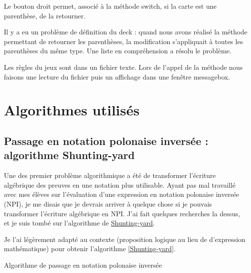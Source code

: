 \documentclass[12pt, algo]{cours}
\begin{document}
Le bouton droit permet, associé à la méthode switch, si la carte est une parenthèse, de la retourner.

Il y a eu un problème de définition du deck : quand nous avons réalisé la méthode permettant de retourner les parenthèses, la modification s'appliquait à toutes les parenthèses du même type. Une liste en compréhension a résolu le problème.

Les règles du jeux sont dans un fichier texte. Lors de l'appel de la méthode nous faisons une lecture du fichier puis un affichage dans une fenêtre messagebox.


\section{Algorithmes utilisés}

\subsection{Passage en notation polonaise inversée : algorithme Shunting-yard}

Une des premier problème algorithmique a été de transformer l'écriture algébrique des preuves en une notation plus utilisable. Ayant pas mal travaillé avec mes élèves sur l'évaluation d'une expression en notation polonaise inversée (NPI), je me disais que je devrais arriver à quelque chose si je pouvais transformer l'écriture algébrique en NPI. J'ai fait quelques recherches la dessus, et je suis tombé sur l'algorithme de \href{https://fr.wikipedia.org/wiki/Algorithme_Shunting-yard}{Shunting-yard}.

Je l'ai légèrement adapté au contexte (proposition logique au lieu de d'expression mathématique) pour obtenir l'algorithme \ref{Shunting-yard}.


\begin{algorithm}
\caption{Algorithme de passage en notation polonaise inversée}
\label{Shunting-yard}
\end{algorithm}
\end{document}

